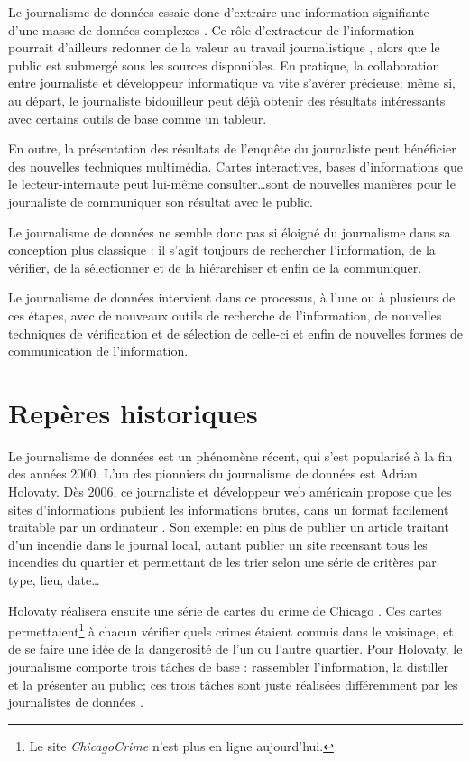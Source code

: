 Le journalisme de données essaie donc d'extraire une information signifiante 
d'une masse de données complexes \cite{handbook}. Ce rôle d'extracteur de l'information pourrait d'ailleurs redonner de la valeur au travail journalistique \cite{grevisse}, alors que le public est submergé sous les sources disponibles. 
En pratique, la collaboration entre journaliste et développeur 
informatique va vite s'avérer précieuse; même si, au départ, le journaliste \og 
bidouilleur \fg peut déjà obtenir des résultats intéressants avec certains outils de 
base comme un tableur.

En outre, la présentation des résultats de l'enquête du journaliste peut bénéficier 
des nouvelles techniques multimédia. Cartes interactives, bases d'informations
que le lecteur-internaute peut lui-même consulter\dots sont de nouvelles
manières pour le journaliste de communiquer son résultat avec le public. \cite{handbook,bradshaw}

Le journalisme de données ne semble donc pas si éloigné du journalisme dans sa conception 
plus classique : il s'agit toujours de rechercher l'information, de la vérifier, 
de la sélectionner et de la hiérarchiser et enfin de la communiquer. 

Le journalisme de données intervient dans ce processus, à l'une ou à plusieurs de ces 
étapes, avec de nouveaux outils de recherche de l'information, de nouvelles 
techniques de vérification et de sélection de celle-ci et enfin de nouvelles 
formes de communication de l'information. \cite{handbook}


\section{Repères historiques}

Le journalisme de données est un phénomène récent, qui s'est popularisé à la
fin des années 2000. L'un des pionniers du journalisme de données est Adrian Holovaty. Dès 2006, 
ce journaliste et développeur web américain propose \cite{holovaty} que les sites d'informations publient les informations 
brutes, dans un format facilement traitable par un ordinateur \cite{handbookfr}.
Son exemple: en plus de publier un article traitant d'un incendie dans le 
journal local, autant publier un site recensant tous les incendies du quartier 
et permettant de les trier selon une série de critères par type, lieu, date\dots

Holovaty réalisera ensuite une série de \og cartes du crime \fg de 
Chicago \cite{bradshaw}. Ces cartes permettaient\footnote{Le site \textit{ChicagoCrime} n'est plus en ligne aujourd'hui.} à chacun vérifier quels crimes étaient commis dans le voisinage, et de se faire une idée de la dangerosité de l'un ou l'autre quartier.
Pour Holovaty, le journalisme comporte trois tâches de base : rassembler l'information, la distiller et la présenter au public; ces trois tâches sont juste réalisées différemment par les journalistes de données \cite{bradshaw}.



